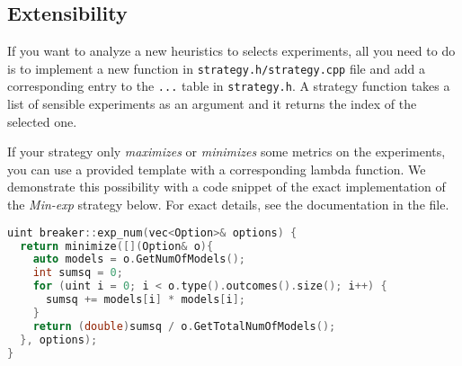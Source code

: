 \subsection{Extensibility}

If you want to analyze a new heuristics to selects experiments,
  all you need to do is to implement a new function
  in \texttt{strategy.h/strategy.cpp} file and add a corresponding entry
  to the \texttt{...} table in \texttt{strategy.h}.
A strategy function takes a list of sensible experiments as an argument
  and it returns the index of the selected one.

If your strategy only \emph{maximizes} or \emph{minimizes}
  some metrics on the experiments,
  you can use a provided template with a corresponding lambda function.
We demonstrate this possibility with a code snippet of
  the exact implementation of the \emph{Min-exp} strategy below.
For exact details, see the documentation in the file.

\begin{lstlisting}[language=C++]
uint breaker::exp_num(vec<Option>& options) {
  return minimize([](Option& o){
    auto models = o.GetNumOfModels();
    int sumsq = 0;
    for (uint i = 0; i < o.type().outcomes().size(); i++) {
      sumsq += models[i] * models[i];
    }
    return (double)sumsq / o.GetTotalNumOfModels();
  }, options);
}
\end{lstlisting}

